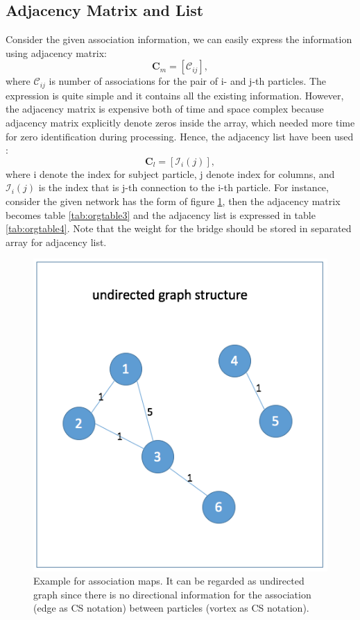 \documentclass[10pt, a4paper]{article}
\begin{document}
\begin{appendices}
\section{Adjacency Matrix and List}
\label{sec:orgheadline3}
Consider the given association information, we can easily express the information using adjacency matrix:
\begin{equation}
\mathbf{C}_m = \left[\mathscr{C}_{ij}\right],
\end{equation}
where \(\mathscr{C}_{ij}\) is number of associations for the pair of i- and j-th particles.
The expression is quite simple and it contains all the existing information. However, the adjacency matrix is expensive both of time and space complex because adjacency matrix explicitly denote zeros inside the array, which needed more time for zero identification during processing. Hence, the adjacency list have been used :
\begin{equation}
\mathbf{C}_l = \left[\mathscr{I}_{i}(j)\right],
\end{equation}
where i denote the index for subject particle, j denote index for columns, and \(\mathscr{I}_{i}(j)\) is the index that is j-th connection to the i-th particle. 
For instance, consider the given network has the form of figure \ref{orgkeyword1}, then the adjacency matrix becomes table \ref{tab:orgtable3} and the adjacency list is expressed in table \ref{tab:orgtable4}. Note that the weight for the bridge should be stored in separated array for adjacency list.

\begin{figure}
\centering
\includegraphics[width=.5\linewidth]{../data_structure/ex_graph_association.png}
\caption{Example for association maps. It can be regarded as undirected graph since there is no directional information for the association (edge as CS notation) between particles (vortex as CS notation).}
\label{orgkeyword1}
\end{figure}



\end{appendices}
\end{document}
